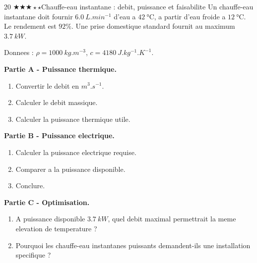 \documentclass[11pt,a4paper]{article}
\newcommand{\diffthree}{\(\bigstar\bigstar\bigstar\star\star\)}
\begin{document}
\begin{probleme}{20 \diffthree}{Chauffe-eau instantane : debit, puissance et faisabilite}
Un chauffe-eau instantane doit fournir \(\SI{6.0}{L.min^{-1}}\) d'eau a \(\SI{42}{\celsius}\), a partir d'eau froide a \(\SI{12}{\celsius}\). Le rendement est \(92\%\). Une prise domestique standard fournit au maximum \(\SI{3.7}{kW}\).

Donnees : \(\rho=\SI{1000}{kg.m^{-3}}\), \(c=\SI{4180}{J.kg^{-1}.K^{-1}}\).

\textbf{Partie A - Puissance thermique.}
\begin{enumerate}
\item Convertir le debit en \(\si{m^3.s^{-1}}\).
\item Calculer le debit massique.
\item Calculer la puissance thermique utile.
\end{enumerate}

\textbf{Partie B - Puissance electrique.}
\begin{enumerate}[resume]
\item Calculer la puissance electrique requise.
\item Comparer a la puissance disponible.
\item Conclure.
\end{enumerate}

\textbf{Partie C - Optimisation.}
\begin{enumerate}[resume]
\item A puissance disponible \(\SI{3.7}{kW}\), quel debit maximal permettrait la meme elevation de temperature ?
\item Pourquoi les chauffe-eau instantanes puissants demandent-ils une installation specifique ?
\end{enumerate}
\end{probleme}
\end{document}
